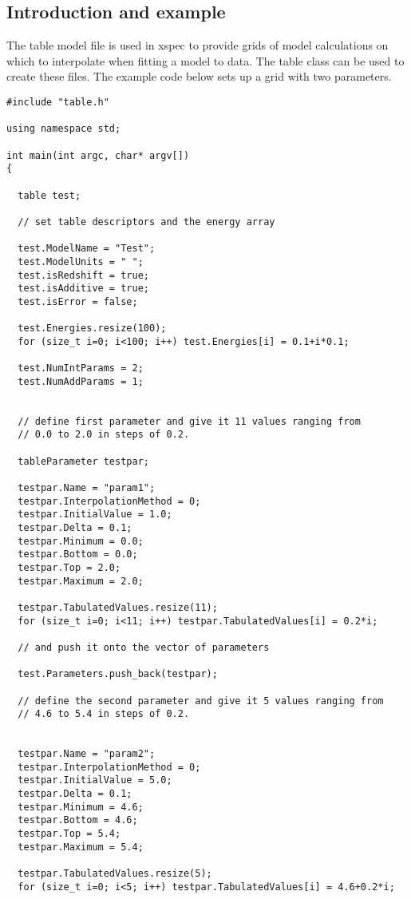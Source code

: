\documentclass[11pt]{book}
\begin{document}
\subsection{Introduction and example}

The table model file is used in xspec to provide grids of model
calculations on which to interpolate when fitting a model to data. The
table class can be used to create these files. The example code below
sets up a grid with two parameters.

\begin{verbatim}
#include "table.h"

using namespace std;

int main(int argc, char* argv[])
{

  table test;

  // set table descriptors and the energy array

  test.ModelName = "Test";
  test.ModelUnits = " ";
  test.isRedshift = true;
  test.isAdditive = true;
  test.isError = false;

  test.Energies.resize(100);
  for (size_t i=0; i<100; i++) test.Energies[i] = 0.1+i*0.1;

  test.NumIntParams = 2;
  test.NumAddParams = 1;


  // define first parameter and give it 11 values ranging from
  // 0.0 to 2.0 in steps of 0.2.

  tableParameter testpar;

  testpar.Name = "param1";
  testpar.InterpolationMethod = 0;
  testpar.InitialValue = 1.0;
  testpar.Delta = 0.1;
  testpar.Minimum = 0.0;
  testpar.Bottom = 0.0;
  testpar.Top = 2.0;
  testpar.Maximum = 2.0;

  testpar.TabulatedValues.resize(11);
  for (size_t i=0; i<11; i++) testpar.TabulatedValues[i] = 0.2*i;

  // and push it onto the vector of parameters

  test.Parameters.push_back(testpar);

  // define the second parameter and give it 5 values ranging from
  // 4.6 to 5.4 in steps of 0.2.


  testpar.Name = "param2";
  testpar.InterpolationMethod = 0;
  testpar.InitialValue = 5.0;
  testpar.Delta = 0.1;
  testpar.Minimum = 4.6;
  testpar.Bottom = 4.6;
  testpar.Top = 5.4;
  testpar.Maximum = 5.4;

  testpar.TabulatedValues.resize(5);
  for (size_t i=0; i<5; i++) testpar.TabulatedValues[i] = 4.6+0.2*i;


\end{verbatim}
\end{document}
